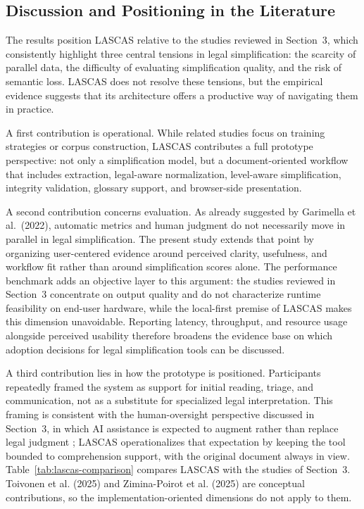 \documentclass[english]{UNISINOSartigo} %
\begin{document}
\subsection{Discussion and Positioning in the Literature}

The results position LASCAS relative to the studies reviewed in Section~3, which consistently highlight three central tensions in legal simplification: the scarcity of parallel data, the difficulty of evaluating simplification quality, and the risk of semantic loss. LASCAS does not resolve these tensions, but the empirical evidence suggests that its architecture offers a productive way of navigating them in practice.

A first contribution is operational. While related studies focus on training strategies or corpus construction, LASCAS contributes a full prototype perspective: not only a simplification model, but a document-oriented workflow that includes extraction, legal-aware normalization, level-aware simplification, integrity validation, glossary support, and browser-side presentation.

A second contribution concerns evaluation. As already suggested by Garimella et al.~(2022), automatic metrics and human judgment do not necessarily move in parallel in legal simplification. The present study extends that point by organizing user-centered evidence around perceived clarity, usefulness, and workflow fit rather than around simplification scores alone. The performance benchmark adds an objective layer to this argument: the studies reviewed in Section~3 concentrate on output quality and do not characterize runtime feasibility on end-user hardware, while the local-first premise of LASCAS makes this dimension unavoidable. Reporting latency, throughput, and resource usage alongside perceived usability therefore broadens the evidence base on which adoption decisions for legal simplification tools can be discussed.

A third contribution lies in how the prototype is positioned. Participants repeatedly framed the system as support for initial reading, triage, and communication, not as a substitute for specialized legal interpretation. This framing is consistent with the human-oversight perspective discussed in Section~3, in which AI assistance is expected to augment rather than replace legal judgment \cite{toivonen2025jelt, zimina2025gai}; LASCAS operationalizes that expectation by keeping the tool bounded to comprehension support, with the original document always in view. Table~\ref{tab:lascas-comparison} compares LASCAS with the studies of Section~3. Toivonen et al. (2025) and Zimina-Poirot et al. (2025) are conceptual contributions, so the implementation-oriented dimensions do not apply to them.
\end{document}
